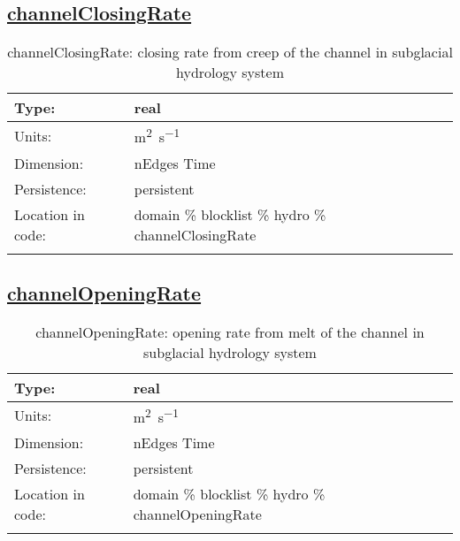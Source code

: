 \subsection[channelClosingRate]{\hyperref[sec:var_tab_hydro]{channelClosingRate}}
\label{subsec:var_sec_hydro_channelClosingRate}
\begin{center}
\begin{longtable}{| p{2.0in} | p{4.0in} |}
        \hline 
        Type: & real \\
        \hline 
        Units: & \si{m^{2}.s^{-1}} \\
        \hline 
        Dimension: & nEdges Time \\
        \hline 
        Persistence: & persistent \\
        \hline 
         Location in code: & domain \% blocklist \% hydro \% channelClosingRate \\
         \hline 
    \caption{channelClosingRate: closing rate from creep of the channel in subglacial hydrology system}
\end{longtable}
\end{center}
\subsection[channelOpeningRate]{\hyperref[sec:var_tab_hydro]{channelOpeningRate}}
\label{subsec:var_sec_hydro_channelOpeningRate}
\begin{center}
\begin{longtable}{| p{2.0in} | p{4.0in} |}
        \hline 
        Type: & real \\
        \hline 
        Units: & \si{m^{2}.s^{-1}} \\
        \hline 
        Dimension: & nEdges Time \\
        \hline 
        Persistence: & persistent \\
        \hline 
         Location in code: & domain \% blocklist \% hydro \% channelOpeningRate \\
         \hline 
    \caption{channelOpeningRate: opening rate from melt of the channel in subglacial hydrology system}
\end{longtable}
\end{center}
